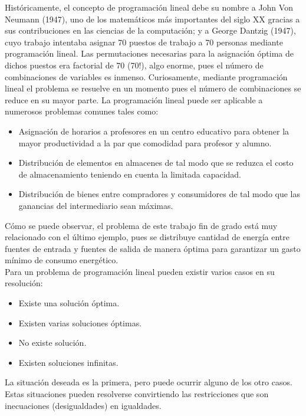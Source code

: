 Históricamente, el concepto de programación lineal debe su nombre a John Von Neumann (1947), uno de los matemáticos más importantes del siglo XX gracias a sus contribuciones en las ciencias de la computación; y a George Dantzig (1947), cuyo trabajo intentaba asignar 70 puestos de trabajo a 70 personas mediante programación lineal. Las permutaciones necesarias para la asignación óptima de dichos puestos era factorial de 70 (70!), algo enorme, pues el número de combinaciones de variables es inmenso. Curiosamente, mediante programación lineal el problema se resuelve en un momento pues el número de combinaciones se reduce en su mayor parte. La programación lineal puede ser aplicable a numerosos problemas comunes tales como:
\begin{itemize}
\item Asignación de horarios a profesores en un centro educativo para obtener la mayor productividad a la par que comodidad para profesor y alumno.
\item Distribución de elementos en almacenes de tal modo que se reduzca el costo de almacenamiento teniendo en cuenta la limitada capacidad.
\item Distribución de bienes entre compradores y consumidores de tal modo que las ganancias del intermediario sean máximas.
\end{itemize}
Cómo se puede observar, el problema de este trabajo fin de grado está muy relacionado con el último ejemplo, pues se distribuye cantidad de energía entre fuentes de entrada y fuentes de salida de manera óptima para garantizar un gasto mínimo de consumo energético.\\

Para un problema de programación lineal pueden existir varios casos en su resolución:
\begin{itemize}
\item Existe una solución óptima.
\item Existen varias soluciones óptimas.
\item No existe solución.
\item Existen soluciones infinitas.
\end{itemize}
La situación deseada es la primera, pero puede ocurrir alguno de los otro casos. Estas situaciones pueden resolverse convirtiendo las restricciones que son inecuaciones (desigualdades) en igualdades.\\

